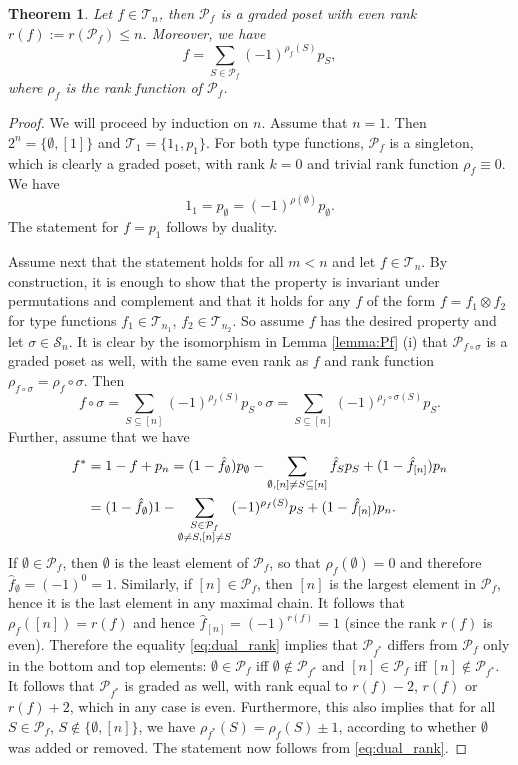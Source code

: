 \documentclass[12pt]{article}
\newtheorem{theorem}{Theorem}
\theoremstyle{definition}
\theoremstyle{remark}
\def\Te{\mathcal T}
\def\Pe{\mathcal P}
\def\permut{\mathscr{S}}
\begin{document}
\begin{theorem}\label{thm:graded} Let $f\in \Te_n$, then $\mathcal P_f$ is a graded poset
with even rank $r(f):=r(\Pe_f)\le n$.  Moreover, we have
\[
f=\sum_{S\in \mathcal P_f}(-1)^{\rho_f(S)}p_S,
\]
where $\rho_f$ is the rank function of $\Pe_f$.

\end{theorem}


\begin{proof} We will proceed by induction on $n$. Assume that  $n=1$. Then  $2^n=\{\emptyset, [1]\}$ and
$\Te_1=\{1_1,p_1\}$. For both type functions, $\mathcal P_f$ is a singleton, which 
is clearly a graded poset, with rank $k=0$ and trivial rank function $\rho_f\equiv 0$.  We have
\[
1_1=p_\emptyset=(-1)^{\rho(\emptyset)}p_\emptyset.
\]
The statement for $f=p_1$ follows by duality.  

Assume next that the statement holds for all $m<n$ and let $f\in \Te_n$. By construction,
it is enough to show that the property is invariant under permutations and complement and
that it holds for any $f$ of the form 
$f=f_1\otimes f_2$ for  type functions $f_1\in \Te_{n_1}$, $f_2\in \Te_{n_2}$.
So assume $f$ has the desired property and let $\sigma\in \permut_n$. 
It is clear by the
isomorphism in Lemma \ref{lemma:Pf} (i) that $\Pe_{f\circ\sigma}$ is a graded poset as
well, with the same even rank as $f$ and rank function
$\rho_{f\circ\sigma}=\rho_f\circ \sigma$. Then
\[
f\circ \sigma=\sum_{S\subseteq [n]} (-1)^{\rho_f(S)}p_S\circ\sigma=\sum_{S\subseteq [n]}
(-1)^{\rho_f\circ \sigma(S)}p_S.
\]
Further, assume that we have
\begin{align}
f^*&=1-f+p_n=(1-\hat f_\emptyset)p_\emptyset -
\sum_{\emptyset, [n]\ne S\subseteq [n]} \hat f_Sp_S+(1-\hat f_{[n]})p_n\notag\\
&=(1-\hat f_\emptyset)1 -\sum_{\substack{S\in \mathcal P_f\\ \emptyset \ne S,
[n]\ne S}}
(-1)^{\rho_f(S)}p_S+(1- \hat f_{[n]})p_n.\label{eq:dual_rank}
\end{align}
If $\emptyset \in \Pe_f$, then $\emptyset$ is the least element of $\Pe_f$, so that 
$\rho_f(\emptyset)=0$ and therefore $\hat f_\emptyset =
(-1)^0=1$. Similarly, if $[n]\in \Pe_f$, then $[n]$ is the largest element in $\Pe_f$,
hence it is the last element in any maximal chain. It follows that $\rho_f([n])=r(f)$ and hence
$\hat f_{[n]}=(-1)^{r(f)}=1$ (since the rank $r(f)$  is even). 
Therefore the equality \eqref{eq:dual_rank} implies that $\mathcal P_{f^*}$ differs from $\mathcal P_f$ only in the bottom  and
top elements:  $\emptyset \in \mathcal P_f$ iff  $\emptyset \notin \mathcal P_{f^*}$
and $[n] \in \mathcal P_f$ iff  $[n] \notin \mathcal P_{f^*}$. It follows that $\mathcal
P_{f^*}$ is graded as well, with rank  equal to $r(f)-2$, $r(f)$ or $r(f)+2$, which in any case
is even. Furthermore,  this also implies 
that for all $S\in \Pe_f$, $S\notin \{\emptyset, [n]\}$, we
have  $\rho_{f^*}(S)=\rho_f(S)\pm 1$, according to whether $\emptyset$ was added or removed. The
statement now follows from \eqref{eq:dual_rank}. 



\end{proof}
\end{document}
